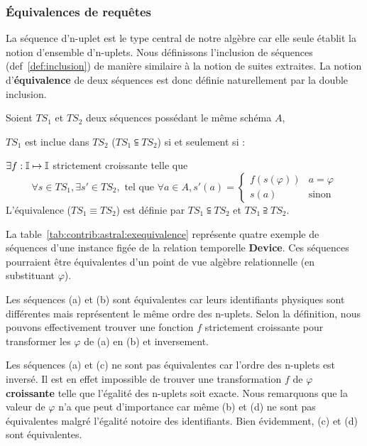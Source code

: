 \subsubsection{Équivalences de requêtes}
La séquence d'n-uplet est le type central de notre algèbre car elle seule établit la notion d'ensemble d'n-uplets. Nous définissons l'inclusion de séquences (def~\ref{def:inclusion}) de manière similaire à la notion de suites extraites. La notion d'\textbf{équivalence} de deux séquences est donc définie naturellement par la double inclusion. 
\begin{defi}\label{def:inclusion}
	Soient $TS_1$ et $TS_2$ deux séquences possédant le même schéma $A$,
	
	$TS_1$ est inclue dans $TS_2$ ($TS_1 \subseteqq TS_2$) si et seulement si : 
	
	\quad \quad $\exists f:\mathbb{I} \mapsto \mathbb{I}$ strictement croissante telle que 
$$\forall s\in TS_1, \exists s'\in TS_2, \textrm{ tel que } \forall a \in A, s'(a) = \begin{cases} f(s(\varphi)) & a = \varphi \\ s(a) & \textrm{sinon}\end{cases}$$
	L'équivalence ($TS_1 \equiv TS_2$) est définie par $TS_1 \subseteqq TS_2$ et $TS_1 \supseteqq TS_2$. 
\end{defi}%


\begin{example}
La table~\ref{tab:contrib:astral:exequivalence} représente quatre exemple de séquences d'une instance figée de la relation temporelle \textbf{Device}. Ces séquences pourraient être équivalentes d'un point de vue algèbre relationnelle (en substituant $\varphi$).

Les séquences (a) et (b) sont équivalentes car leurs identifiants physiques sont différentes mais représentent le même ordre des n-uplets. Selon la définition, nous pouvons effectivement trouver une fonction $f$ strictement croissante pour transformer les $\varphi$ de (a) en (b) et inversement. 

Les séquences (a) et (c) ne sont pas équivalentes car l'ordre des n-uplets est inversé. Il est en effet impossible de trouver une transformation $f$ de $\varphi$ \textbf{croissante} telle que l'égalité des n-uplets soit exacte. Nous remarquons que la valeur de $\varphi$ n'a que peut d'importance car même (b) et (d) ne sont pas équivalentes malgré l'égalité notoire des identifiants. Bien évidemment, (c) et (d) sont équivalentes.
\end{example}


